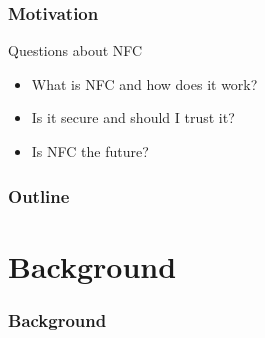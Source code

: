 \documentclass[unknownkeysallowed]{beamer}
\begin{document}
\begin{frame}
\frametitle{Motivation}
  \begin{center}
    \begin{minipage}{.7\textwidth}
  	 \begin{block}{Questions about NFC}
        \begin{itemize}
  		    \item{What is NFC and how does it work?}
  		    \item{Is it secure and should I trust it?}
  		    \item{Is NFC the future?}
     		\end{itemize}
     \end{block}
    \end{minipage}
  \end{center}
\end{frame}

\begin{frame}
  \frametitle{Outline}
    \begin{center}\begin{minipage}{.9\textwidth}
        \tableofcontents[
          currentsection,
          sectionstyle=show/show,
          subsectionstyle=show/shaded/hide
        ]
    \end{minipage}\end{center}
 \end{frame}


\Fontix

\section{Background}
\begin{frame}
  \frametitle{Background}
    \begin{center}\begin{minipage}{.9\textwidth}
    \tableofcontents[currentsubsection, hideothersubsections, sectionstyle=show/shaded]
    \end{minipage}\end{center}
\end{frame}
%
\end{document}
